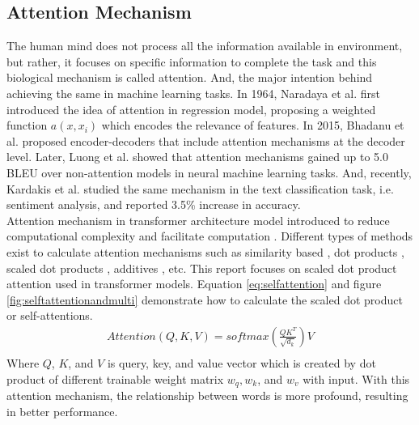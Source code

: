 \documentclass[%
	BCOR=8mm, %
	DIV=12,
	toc=bibliography, %
	toc=listof, %
	oneside, %
	egregdoesnotlikesansseriftitles, %
	]{scrbook}
\begin{document}
\subsection{Attention Mechanism}
The human mind does not process all the information available in environment, but rather, it focuses on specific information to complete the task and this biological mechanism is called attention. And, the major intention behind achieving the same in machine learning tasks. In 1964, Naradaya et al. \cite{nadaraya_estimating_1964} first introduced the idea of attention in regression model, proposing a weighted function $a(x,x_{i})$ which encodes the relevance of features. In 2015, Bhadanu et al. \cite{bahdanau_neural_2014} proposed encoder-decoders that include attention mechanisms at the decoder level. Later, Luong et al. \cite{luong_effective_2015} showed that attention mechanisms gained up to 5.0 BLEU over non-attention models in neural machine learning tasks. And, recently, Kardakis et al. \cite{kardakis_examining_2021} studied the same mechanism in the text classification task, i.e. sentiment analysis, and reported 3.5\% increase in accuracy.\\
Attention mechanism in transformer architecture model introduced to reduce computational complexity and facilitate computation \cite{vaswani_attention_2017}. Different types of methods exist to calculate attention mechanisms such as similarity based \cite{graves_neural_2014}, dot products \cite{luong_effective_2015}, scaled dot products \cite{vaswani_attention_2017}, additives \cite{bahdanau_neural_2014}, etc. This report focuses on scaled dot product attention used in transformer models. Equation  \ref{eq:selfattention}  and figure \ref{fig:selftattentionandmulti} demonstrate how to calculate the scaled dot product or self-attentions.
\begin{equation}
    \begin{aligned}
        Attention(Q,K,V)=softmax(\frac{QK^T}{\sqrt{d_{k}}})V\\
        \label{eq:selfattention}
    \end{aligned}
\end{equation}
Where $Q$, $K$, and $V$ is query, key, and value vector which is created  by dot product of different trainable weight matrix $w_{q},w_{k}$, and $ w_{v}$ with input. With this attention mechanism, the relationship between words is more profound, resulting in better performance.\\
\end{document}

